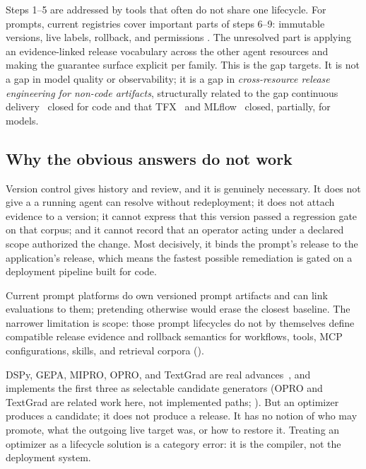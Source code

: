 Steps 1--5 are addressed by tools that often do not share one lifecycle. For
prompts, current registries cover important parts of steps 6--9: immutable versions,
live labels, rollback, and permissions
\cite{mlflowpromptregistry,langsmithprompts,langfuseprompts}. The unresolved part is
applying an evidence-linked release vocabulary across the other agent resources and
making the guarantee surface explicit per family. This is the gap \sys targets. It
is not a gap in model quality or observability; it is a gap in \emph{cross-resource
release engineering for non-code artifacts}, structurally related to the gap continuous
delivery~\cite{humble2010cd} closed for code and that TFX~\cite{baylor2017tfx} and
MLflow~\cite{zaharia2018mlflow} closed, partially, for models.

\subsection{Why the obvious answers do not work}

 Version control gives history and review, and
it is genuinely necessary. It does not give a \livetarget{} a running agent can
resolve without redeployment; it does not attach evidence to a version; it cannot
express that this version passed a regression gate on that corpus; and it cannot
record that an operator acting under a declared scope authorized the change. Most
decisively, it binds the prompt's release to the application's release, which
means the fastest possible remediation is gated on a deployment pipeline built for
code.

 Current prompt platforms
do own versioned prompt artifacts and can link evaluations to them; pretending
otherwise would erase the closest baseline. The narrower limitation is scope:
those prompt lifecycles do not by themselves define compatible release evidence and
rollback semantics for workflows, tools, MCP configurations, skills, and retrieval
corpora ().

 DSPy, GEPA, MIPRO, OPRO, and TextGrad are real
advances~\cite{khattab2024dspy,agrawal2025gepa,
opsahlong2024mipro,yang2024opro,yuksekgonul2024textgrad}, and \sys implements
the first three as selectable candidate generators (OPRO and TextGrad are
related work here, not implemented paths; ). But an optimizer
produces a candidate; it does not produce a release. It has no notion of who may
promote, what the outgoing live target was, or how to restore it. Treating an
optimizer as a lifecycle solution is a category error: it is the compiler, not the
deployment system.

